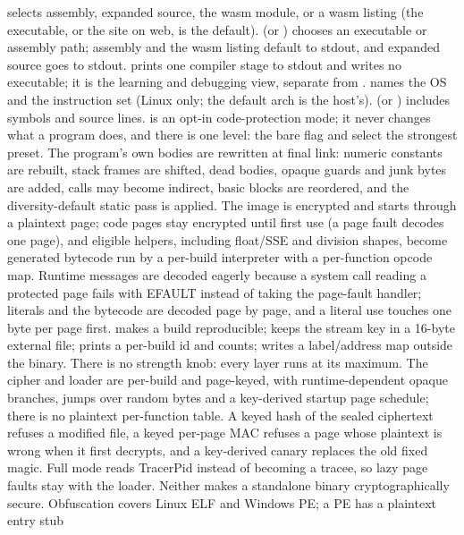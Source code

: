  selects assembly, expanded source, the wasm
module, or a wasm listing (the executable, or the site on web, is the default).  (or )
chooses an executable or assembly path; assembly and the wasm listing default
to stdout, and expanded source goes to stdout.
 prints one compiler stage to
stdout and writes no executable; it is the learning and debugging view, separate
from . 
names the OS and  the instruction set (Linux only; the
default arch is the host's).  (or ) includes symbols and
source lines.
 is an opt-in code-protection mode; it never changes what a
program does, and there is one level: the bare flag and 
select the strongest preset. The program's own
bodies are rewritten at final link: numeric constants are rebuilt, stack frames
are shifted, dead bodies, opaque guards and junk bytes are added, calls may
become indirect, basic blocks are reordered, and the diversity-default static
pass is applied. The image is encrypted and starts through a plaintext page;
code pages stay encrypted until first use (a page fault decodes one page), and
eligible helpers, including float/SSE and division shapes, become generated
bytecode run by a per-build interpreter with a per-function opcode map.
Runtime messages are decoded eagerly because a system call reading a protected
page fails with EFAULT instead of taking the page-fault handler; literals and
the bytecode are decoded page by page, and a literal use touches one byte per
page first.  makes a build reproducible;
 keeps the stream key in a 16-byte external file;
 prints a per-build id and counts;
 writes a label/address map outside the binary. There is no
strength knob: every layer runs at its maximum. The
cipher and loader are per-build and page-keyed, with
runtime-dependent opaque branches, jumps over random bytes and a key-derived
startup page schedule; there is no plaintext per-function table. A keyed hash
of the sealed ciphertext refuses a modified file, a keyed per-page MAC refuses
a page whose plaintext is wrong when it first decrypts, and a key-derived
canary replaces the old fixed magic. Full mode reads TracerPid instead of becoming a
tracee, so lazy page faults stay with the loader. Neither makes a standalone
binary cryptographically secure.
Obfuscation covers Linux ELF and Windows PE; a PE has a plaintext entry stub
